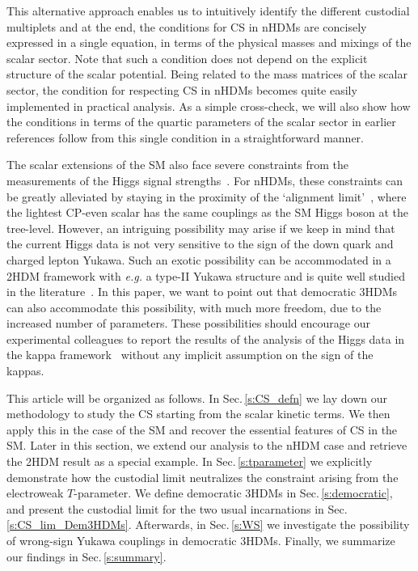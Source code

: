 \documentclass[11pt]{article}
\def\Sect#1{Sec.\,\ref{#1}}
\begin{document}
This alternative approach enables us to intuitively identify the different custodial multiplets and at the end, the conditions for CS in nHDMs are concisely expressed in a single equation, in terms of the physical masses and mixings of the scalar sector.  
Note that such a condition does not depend on the explicit structure of the scalar potential.  
Being related to the mass matrices of the scalar sector, the condition for respecting CS in nHDMs becomes quite easily implemented in practical analysis.  
As a simple cross-check, we will also show how the conditions in terms of the quartic parameters of the scalar sector in earlier references follow from this single condition in a straightforward manner.

%
The scalar extensions of the SM also face severe constraints from the measurements of the Higgs signal strengths~\cite{ATLAS:2021vrm}.  
For nHDMs, these constraints can be greatly alleviated by staying in the proximity of the `alignment limit'~\cite{Das:2019yad, Das:2015mwa, Gunion:2002zf, Bhattacharyya:2013rya, Pilaftsis:2016erj, BhupalDev:2014bir, Carena:2013ooa, Darvishi:2021txa}, where the lightest CP-even scalar has the same couplings as the SM Higgs boson at the tree-level.  
However, an intriguing possibility may arise if we keep in mind that the current Higgs data is not very sensitive to the sign of the down quark and charged lepton Yukawa.
Such an exotic possibility can be accommodated in a 2HDM framework with \textit{e.g.} a type-II Yukawa structure and is quite well studied in the literature~\cite{Fontes:2014tga, Biswas:2015zgk, Ferreira:2014dya,Ferreira:2014qda}.  
In this paper, we want to point out that democratic 3HDMs can also accommodate this possibility, with much more freedom, due to the increased number of parameters.  
%
These possibilities should encourage our experimental colleagues to report the results
of the analysis of the Higgs data in the kappa framework~\cite{LHCHiggsCrossSectionWorkingGroup:2012nn, LHCHiggsCrossSectionWorkingGroup:2013rie} without any implicit
assumption on the sign of the kappas.

%
This article will be organized as follows.  
In \Sect{s:CS_defn} we lay down our methodology to study the CS starting from the
scalar kinetic terms. We then apply this in the case of the SM and recover the essential
features of CS in the SM. Later in this section, we extend our analysis to the nHDM case
and retrieve the 2HDM result as a special example. In \Sect{s:tparameter} we explicitly
demonstrate how the custodial limit neutralizes the constraint arising from the
electroweak $T$-parameter.
%  
We define democratic 3HDMs in \Sect{s:democratic}, and present the custodial limit for the two usual incarnations in \Sect{s:CS_lim_Dem3HDMs}.  
Afterwards, in \Sect{s:WS} we investigate the possibility of wrong-sign Yukawa couplings in democratic 3HDMs.  
Finally, we summarize our findings in \Sect{s:summary}.  
\end{document}
